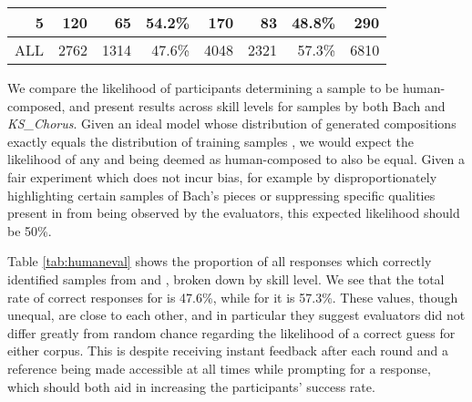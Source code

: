 \documentclass{article}
\begin{document}
\begin{table}
\begin{tabular}{rrrrrrrr}
5                                  & 120                         & 65                          & 54.2\%                    & 170                         & 83                          & 48.8\%                    & 290                                         \\ 
\hline
\multicolumn{1}{l}{ALL}            & 2762                        & 1314                        & 47.6\%                    & 4048                        & 2321                        & 57.3\%                    & 6810                                       
\end{tabular}
\end{table}

We compare the likelihood of participants determining a sample to be human-composed, and present results across skill levels for samples by both Bach and \textit{KS\_Chorus}. Given an ideal model whose distribution of generated compositions  exactly equals the distribution of training samples , we would expect the likelihood of any  and  being deemed as human-composed to also be equal. Given a fair experiment which does not incur bias, for example by disproportionately highlighting certain samples of Bach's pieces or suppressing specific qualities present in  from being observed by the evaluators, this expected likelihood should be 50\%.

Table \ref{tab:humaneval} shows the proportion of all responses which correctly identified samples from  and , broken down by skill level. We see that the total rate of correct responses for  is 47.6\%, while for  it is 57.3\%. These values, though unequal, are close to each other, and in particular they suggest evaluators did not differ greatly from random chance regarding the likelihood of a correct guess for either corpus. This is despite receiving instant feedback after each round and a reference  being made accessible at all times while prompting for a response, which should both aid in increasing the participants' success rate.
\end{document}

